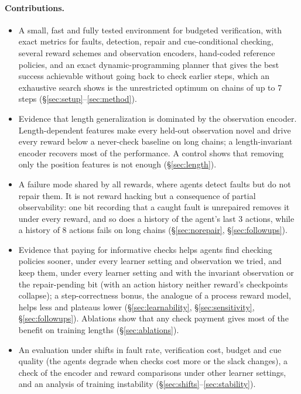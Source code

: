 \paragraph{Contributions.}
\begin{itemize}
  \item A small, fast and fully tested environment for budgeted verification, with exact metrics for faults, detection, repair and cue-conditional checking, several reward schemes and observation encoders, hand-coded reference policies, and an exact dynamic-programming planner that gives the best success achievable without going back to check earlier steps, which an exhaustive search shows is the unrestricted optimum on chains of up to 7 steps (\S\ref{sec:setup}--\ref{sec:method}).
  \item Evidence that length generalization is dominated by the observation encoder. Length-dependent features make every held-out observation novel and drive every reward below a never-check baseline on long chains; a length-invariant encoder recovers most of the performance. A control shows that removing only the position features is not enough (\S\ref{sec:length}).
  \item A failure mode shared by all rewards, where agents detect faults but do not repair them. It is not reward hacking but a consequence of partial observability: one bit recording that a caught fault is unrepaired removes it under every reward, and so does a history of the agent's last 3 actions, while a history of 8 actions fails on long chains (\S\ref{sec:norepair}, \S\ref{sec:followups}).
  \item Evidence that paying for informative checks helps agents find checking policies sooner, under every learner setting and observation we tried, and keep them, under every learner setting and with the invariant observation or the repair-pending bit (with an action history neither reward's checkpoints collapse); a step-correctness bonus, the analogue of a process reward model, helps less and plateaus lower (\S\ref{sec:learnability}, \S\ref{sec:sensitivity}, \S\ref{sec:followups}). Ablations show that any check payment gives most of the benefit on training lengths (\S\ref{sec:ablations}).
  \item An evaluation under shifts in fault rate, verification cost, budget and cue quality (the agents degrade when checks cost more or the slack changes), a check of the encoder and reward comparisons under other learner settings, and an analysis of training instability (\S\ref{sec:shifts}--\ref{sec:stability}).
\end{itemize}

